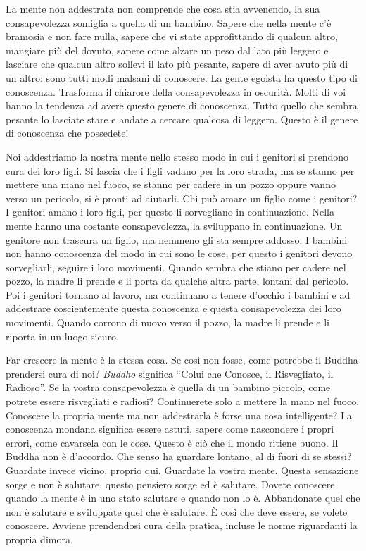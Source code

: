 La mente non addestrata non comprende che cosa stia avvenendo, la sua
consapevolezza somiglia a quella di un bambino. Sapere che nella mente
c'è bramosia e non fare nulla, sapere che vi state approfittando di
qualcun altro, mangiare più del dovuto, sapere come alzare un peso dal
lato più leggero e lasciare che qualcun altro sollevi il lato più
pesante, sapere di aver avuto più di un altro: sono tutti modi malsani
di conoscere. La gente egoista ha questo tipo di conoscenza. Trasforma
il chiarore della consapevolezza in oscurità. Molti di voi hanno la
tendenza ad avere questo genere di conoscenza. Tutto quello che sembra
pesante lo lasciate stare e andate a cercare qualcosa di leggero. Questo
è il genere di conoscenza che possedete!

Noi addestriamo la nostra mente nello stesso modo in cui i genitori si
prendono cura dei loro figli. Si lascia che i figli vadano per la loro
strada, ma se stanno per mettere una mano nel fuoco, se stanno per
cadere in un pozzo oppure vanno verso un pericolo, si è pronti ad
aiutarli. Chi può amare un figlio come i genitori? I genitori amano i
loro figli, per questo li sorvegliano in continuazione. Nella mente
hanno una costante consapevolezza, la sviluppano in continuazione. Un
genitore non trascura un figlio, ma nemmeno gli sta sempre addosso. I
bambini non hanno conoscenza del modo in cui sono le cose, per questo i
genitori devono sorvegliarli, seguire i loro movimenti. Quando sembra
che stiano per cadere nel pozzo, la madre li prende e li porta da
qualche altra parte, lontani dal pericolo. Poi i genitori tornano al
lavoro, ma continuano a tenere d'occhio i bambini e ad addestrare
coscientemente questa conoscenza e questa consapevolezza dei loro
movimenti. Quando corrono di nuovo verso il pozzo, la madre li prende e
li riporta in un luogo sicuro.

Far crescere la mente è la stessa cosa. Se così non fosse, come potrebbe
il Buddha prendersi cura di noi? \emph{Buddho} significa ``Colui che
Conosce, il Risvegliato, il Radioso''. Se la vostra consapevolezza è
quella di un bambino piccolo, come potrete essere risvegliati e radiosi?
Continuerete solo a mettere la mano nel fuoco. Conoscere la propria
mente ma non addestrarla è forse una cosa intelligente? La conoscenza
mondana significa essere astuti, sapere come nascondere i propri errori,
come cavarsela con le cose. Questo è ciò che il mondo ritiene buono. Il
Buddha non è d'accordo. Che senso ha guardare lontano, al di fuori di se
stessi? Guardate invece vicino, proprio qui. Guardate la vostra mente.
Questa sensazione sorge e non è salutare, questo pensiero sorge ed è
salutare. Dovete conoscere quando la mente è in uno stato salutare e
quando non lo è. Abbandonate quel che non è salutare e sviluppate quel
che è salutare. È così che deve essere, se volete conoscere. Avviene
prendendosi cura della pratica, incluse le norme riguardanti la propria
dimora.


